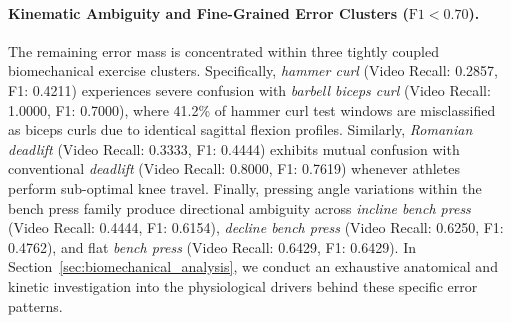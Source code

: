 \documentclass[preprint,12pt]{elsarticle}
\begin{document}
\paragraph{Kinematic Ambiguity and Fine-Grained Error Clusters ($\text{F1} < 0.70$).} The remaining error mass is concentrated within three tightly coupled biomechanical exercise clusters. Specifically, \textit{hammer curl} (Video Recall: 0.2857, F1: 0.4211) experiences severe confusion with \textit{barbell biceps curl} (Video Recall: 1.0000, F1: 0.7000), where 41.2\% of hammer curl test windows are misclassified as biceps curls due to identical sagittal flexion profiles. Similarly, \textit{Romanian deadlift} (Video Recall: 0.3333, F1: 0.4444) exhibits mutual confusion with conventional \textit{deadlift} (Video Recall: 0.8000, F1: 0.7619) whenever athletes perform sub-optimal knee travel. Finally, pressing angle variations within the bench press family produce directional ambiguity across \textit{incline bench press} (Video Recall: 0.4444, F1: 0.6154), \textit{decline bench press} (Video Recall: 0.6250, F1: 0.4762), and flat \textit{bench press} (Video Recall: 0.6429, F1: 0.6429). In Section~\ref{sec:biomechanical_analysis}, we conduct an exhaustive anatomical and kinetic investigation into the physiological drivers behind these specific error patterns.
\end{document}
